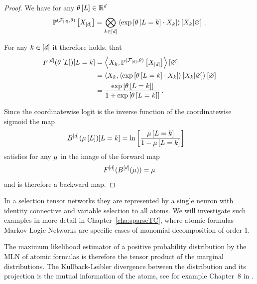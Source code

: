 \begin{proof}
	We have for any $\theta\left[L\right]\in\mathbb{R}^{d}$
		\[ \mathbb{P}^{(\mathcal{F}_{[d]},\theta)}\left[X_{[d]}\right] 
		= \bigotimes_{k\in[d]} \left\langle \mathrm{exp}\left[\theta\left[L=k\right]\cdot X_{k}\right]\right\rangle \left[ X_{k} | \varnothing \right]  \, . \]

	
	For any $k\in[d]$ it therefore holds, that
	\begin{align*}
		F^{[d]}(\theta\left[L\right])[L=k] 
		&=\left\langle X_{k},  \mathbb{P}^{(\mathcal{F}_{[d]},\theta)}\left[X_{[d]}\right]\right\rangle \left[ \varnothing \right] \\
		&=\left\langle X_{k},  \left\langle \mathrm{exp}\left[\theta\left[L=k\right]\cdot X_{k}\right]\right\rangle \left[ X_{k} | \varnothing \right]\right\rangle \left[ \varnothing \right] \\
		& = \frac{\mathrm{exp}\left[\theta\left[L=k\right]\right]}{1+\mathrm{exp}\left[\theta\left[L=k\right]\right]} \, .
	\end{align*}

	Since the coordinatewise logit is the inverse function of the coordinatewise sigmoid the map
	\begin{align*}
		B^{[d]}(\mu\left[L\right])[L=k] 
		& = \ln \left[ \frac{\mu\left[L=k\right]}{1- \mu\left[L=k\right]} \right]
	\end{align*}
	satisfies for any $\mu$ in the image of the forward map
	\begin{align*}
		F^{[d]}(B^{[d]}(\mu)) = \mu 
	\end{align*}
	and is therefore a backward map.
\end{proof}


In a selection tensor networks they are represented by a single neuron with identity connective and variable selection to all atoms.
We will investigate such examples in more detail in Chapter~\ref{cha:sparseTC}, where atomic formulas Markov Logic Networks are specific cases of monomial decomposition of order 1.
	
The maximum likelihood estimator of a positive probability distribution by the MLN of atomic formulas is therefore the tensor product of the marginal distributions.
The Kullback-Leibler divergence between the distribution and its projection is the mutual information of the atoms, see for example Chapter~8 in \cite{mackay_information_2003}.

